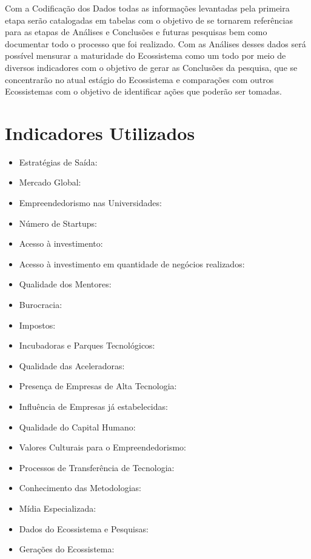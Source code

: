 Com a Codificação dos Dados todas as informações levantadas pela primeira etapa serão catalogadas em tabelas com o objetivo de se tornarem referências para as etapas de Análises e Conclusões e
futuras pesquisas bem como documentar todo o processo que foi realizado. Com as Análises desses dados será possível mensurar a maturidade do Ecossistema como um todo por meio de diversos indicadores
com o objetivo de gerar as Conclusões da pesquisa, que se concentrarão no atual estágio do Ecossistema e comparações com outros Ecossistemas com o objetivo de identificar ações que poderão ser tomadas.

\section{Indicadores Utilizados}
\label{section:indicadores_utilizados}

\begin{itemize}
  \item Estratégias de Saída:
  \item Mercado Global:
  \item Empreendedorismo nas Universidades:
  \item Número de Startups:
  \item Acesso à investimento:
  \item Acesso à investimento em quantidade de negócios realizados:
  \item Qualidade dos Mentores:
  \item Burocracia:
  \item Impostos:
  \item Incubadoras e Parques Tecnológicos:
  \item Qualidade das Aceleradoras:
  \item Presença de Empresas de Alta Tecnologia:
  \item Influência de Empresas já estabelecidas:
  \item Qualidade do Capital Humano:
  \item Valores Culturais para o Empreendedorismo:
  \item Processos de Transferência de Tecnologia:
  \item Conhecimento das Metodologias:
  \item Mídia Especializada:
  \item Dados do Ecossistema e Pesquisas:
  \item Gerações do Ecossistema:
\end{itemize}

